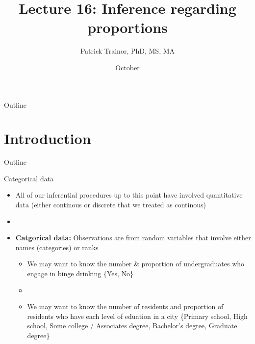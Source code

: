 \documentclass[xcolor=dvipsnames]{beamer}
\title[Lecture 16]{Lecture 16: Inference regarding proportions}
\author[Patrick Trainor]{Patrick Trainor, PhD, MS, MA}
\institute[NMSU]{New Mexico State University}
\date{October}
\begin{document}
	
\begin{frame}
	\maketitle
\end{frame}

\begin{frame}{Outline}
	\tableofcontents[hideallsubsections]
\end{frame}

\section{Introduction}

\begin{frame}{Outline}
	\tableofcontents[currentsection,subsectionstyle=show/shaded/hide]
\end{frame}

\begin{frame}{Categorical data}
	\begin{itemize}
		\item All of our inferential procedures up to this point have involved quantitative data (either continous or discrete that we treated as continous)
		\item[]
		\item \textbf{Catgorical data:} Observations are from random variables that involve either names (categories) or ranks
		\begin{itemize}
			\item We may want to know the number \& proportion of undergraduates who engage in binge drinking \{Yes, No\}
			\item[]
			\item We may want to know the number of residents and proportion of residents who have each level of eduation in a city \{Primary school, High school, Some college / Associates degree, Bachelor's degree, Graduate degree\}
		\end{itemize}
	\end{itemize}
\end{frame}
\end{document}
